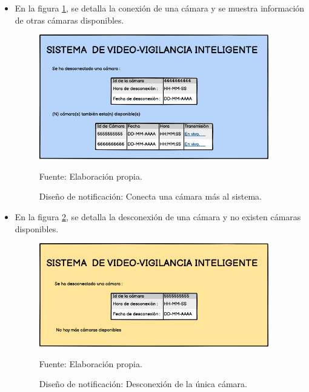 \begin{itemize}
    \item En la figura \ref{fig:desing_cam_conn_more_cams}, se detalla la conexión de una cámara y se muestra información de otras cámaras disponibles.

    \begin{figure}[H]
        \begin{center}
            \includegraphics[width=10cm]{img/capitulo_4/cam_connected_more_cams.png}
        \end{center}
        \begin{center}
            \caption{Diseño de notificación: Conecta una cámara más al sistema.}
            Fuente: Elaboración propia.
            \label{fig:desing_cam_conn_more_cams}
        \end{center}
    \end{figure}
    
    \item En la figura \ref{fig:desing_cam_conn_no_more_cams}, se detalla la desconexión de una cámara y no existen cámaras disponibles.
    
    \begin{figure}[H]
        \begin{center}
            \includegraphics[width=10cm]{img/capitulo_4/cam_connected_no_more_cams.png}
        \end{center}
        \begin{center}
            \caption{Diseño de notificación: Desconexión de la única cámara.}
            Fuente: Elaboración propia.
            \label{fig:desing_cam_conn_no_more_cams}
        \end{center}
    \end{figure}
    

\end{itemize}
